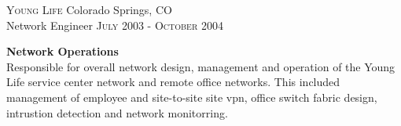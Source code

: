 
\textsc{Young Life} \hfill Colorado Springs, CO\\
Network Engineer \hfill \textsc{July 2003} - \textsc{October 2004}

\textbf{Network Operations}\\
Responsible for overall network design, management and operation of the Young
Life service center network and remote office networks. This included management
of employee and site-to-site site vpn, office switch fabric design, intrustion
detection and network monitorring.  
